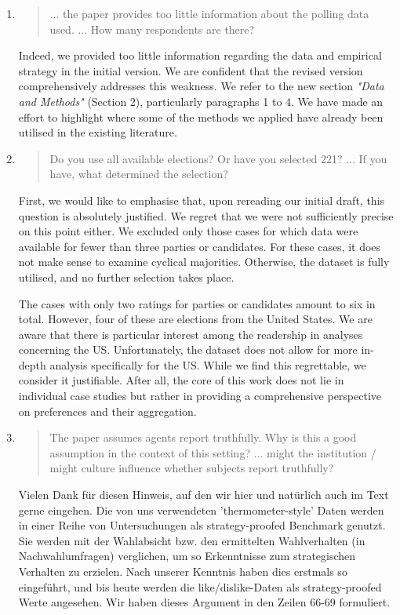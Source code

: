 \documentclass[a4paper, 12pt]{scrartcl}
\begin{document}
\begin{enumerate}[label=(\alph*)] 
	\item
\begin{quote}
$\ldots$ the paper provides too little information about the polling data used. $\ldots$ How many respondents are there?
\end{quote}	
Indeed, we provided too little information regarding the data and empirical strategy in the initial version. We are confident that the revised version comprehensively addresses this weakness. We refer to the new section \textit{"Data and Methods"} (Section 2), particularly paragraphs 1 to 4. We have made an effort to highlight where some of the methods we applied have already been utilised in the existing literature.
\item 
\begin{quote}
	Do you use all available elections? Or have you selected 221? $\ldots$ If you have, what determined the selection?
\end{quote}
First, we would like to emphasise that, upon rereading our initial draft, this question is absolutely justified. We regret that we were not sufficiently precise on this point either. We excluded only those cases for which data were available for fewer than three parties or candidates. For these cases, it does not make sense to examine cyclical majorities. Otherwise, the dataset is fully utilised, and no further selection takes place. 

The cases with only two ratings for parties or candidates amount to six in total. However, four of these are elections from the United States. We are aware that there is particular interest among the readership in analyses concerning the US. Unfortunately, the dataset does not allow for more in-depth analysis specifically for the US. While we find this regrettable, we consider it justifiable. After all, the core of this work does not lie in individual case studies but rather in providing a comprehensive perspective on preferences and their aggregation.
\item \begin{quote}
	The paper assumes agents report truthfully. Why is this a good assumption in the context of this setting? $\ldots$ might the institution / might culture influence whether subjects report truthfully?
\end{quote}

Vielen Dank für diesen Hinweis, auf den wir hier und natürlich auch im Text gerne eingehen. Die von uns verwendeten 'thermometer-style' Daten werden in einer Reihe von Untersuchungen als strategy-proofed Benchmark genutzt. Sie werden mit der Wahlabsicht bzw. den ermittelten Wahlverhalten (in Nachwahlumfragen) verglichen, um so Erkenntnisse zum strategischen Verhalten zu erzielen. Nach unserer Kenntnis haben dies \cite{Abramson2009} erstmals so eingeführt, und bis heute \cite{Eggers2020, Eggers2022, Nunez2024, Eggers2024} werden die like/dislike-Daten als strategy-proofed Werte angesehen. Wir haben dieses Argument in den Zeilen 66-69 formuliert.



\end{enumerate}
\end{document}
